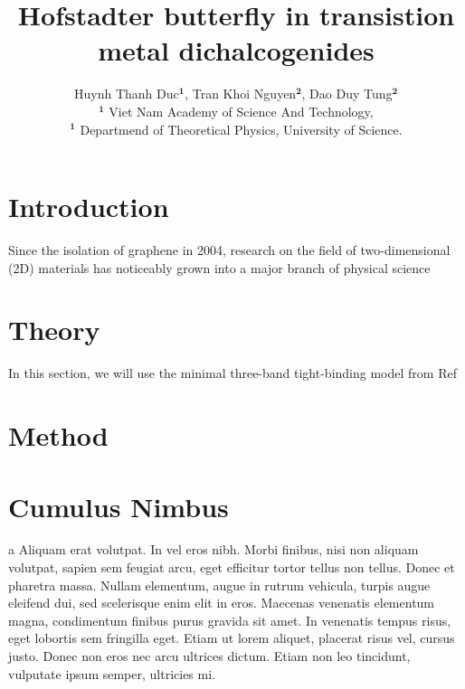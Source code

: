 \documentclass[superscriptaddress,a0]{sciposter}
\title{Hofstadter butterfly in transistion metal dichalcogenides}
\author{Huynh Thanh Duc$\mathbf{^1}$, Tran Khoi Nguyen$\mathbf{^2}$, Dao Duy Tung$\mathbf{^2}$ \\ 
\small $\mathbf{^1}$ Viet Nam Academy of Science And Technology, \\ 
\small $\mathbf{^1}$ Departmend of Theoretical Physics, University of Science.
}
\institute 
{The 50th Vietnam Conference on Theoretical Physics}
\begin{document}

\maketitle

\newcommand{\mycaption}{%
\ifx \@captype \@undefined \@latex@error {\noexpand \caption outside float}\@ehd \expandafter \@gobble \else \refstepcounter \@captype \expandafter \@firstofone \fi {\@dblarg {\@caption \@captype }}%
}%

\begin{multicols}{3}


\section{Introduction}

Since the isolation of graphene in 2004, research on the field of two-dimensional (2D) materials has noticeably grown into a major branch of physical science

\section{Theory}

In this section, we will use the minimal three-band tight-binding model from Ref \cite{PhysRevB.88.085433}



\section{Method}




\section{Cumulus Nimbus}
a
Aliquam erat volutpat. In vel eros nibh. Morbi finibus, nisi non aliquam volutpat, sapien sem feugiat arcu, eget efficitur tortor tellus non tellus. Donec et pharetra massa. Nullam elementum, augue in rutrum vehicula, turpis augue eleifend dui, sed scelerisque enim elit in eros. Maecenas venenatis elementum magna, condimentum finibus purus gravida sit amet. In venenatis tempus risus, eget lobortis sem fringilla eget. Etiam ut lorem aliquet, placerat risus vel, cursus justo. Donec non eros nec arcu ultrices dictum. Etiam non leo tincidunt, vulputate ipsum semper, ultricies mi.


\end{multicols}
\end{document}
